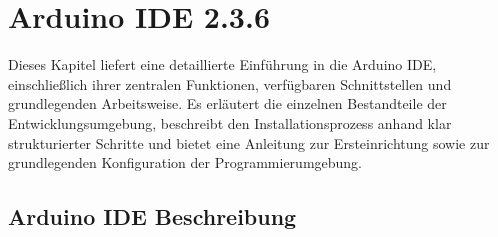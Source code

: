 % 
% 
% 


\chapter{Arduino IDE 2.3.6}\label{chap:Arduino_IDE_Installation} 

Dieses Kapitel liefert eine detaillierte Einführung in die Arduino IDE, einschließlich ihrer zentralen Funktionen, verfügbaren Schnittstellen und grundlegenden Arbeitsweise. Es erläutert die einzelnen Bestandteile der Entwicklungsumgebung, beschreibt den Installationsprozess anhand klar strukturierter Schritte und bietet eine Anleitung zur Ersteinrichtung sowie zur grundlegenden Konfiguration der Programmierumgebung. 

\section{Arduino IDE Beschreibung } 
\label{chap:Arduino_IDE_Beschreibung} 

